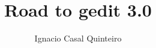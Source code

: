\documentclass[a4paper,11pt,twoside]{book}
\author{Ignacio Casal Quinteiro}
\title{\textbf{\Huge{Road to gedit 3.0}}}
\begin{document}

\newcommand{\addwrapfigure}[4][\textwidth]{
  \begin{wrapfigure}{#2}{#1}
    \vspace{-20pt}
    \begin{center}
      \texttt{[image: \#3]}
    \end{center}
    \vspace{-20pt}
    \caption{#4}
    \vspace{-20pt}
  \end{wrapfigure}
}

\newcommand{\addfigure}[4][width=\textwidth]{
  \begin{figure}[H]
    \begin{center}
      \texttt{[image: \#2]}
      \caption[#3]{#3}\label{#4}
    \end{center}
  \end{figure}
}

\newcommand{\GNOME}{\textsc{Gnome}~}

\newcommand{\graybox}[1]{\colorbox{gray75}{#1}}


\newpage\thispagestyle{empty}
\cleardoublepage


\newpage\thispagestyle{empty}
\cleardoublepage

\pagestyle{fancy}
\fancyhf{}
\fancyhf[HR]{\thepage}
\fancyhf[HL]{\nouppercase\rightmark}

\frontmatter

\tableofcontents
\listoffigures
\listoftables
\newpage\thispagestyle{empty}
\cleardoublepage

\mainmatter
\end{document}
